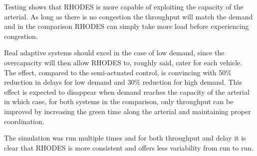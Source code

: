 Testing shows that RHODES is more capable of exploiting the capacity of the arterial. As long as there is no congestion the throughput will match the demand and in the comparison RHODES can simply take more load before experiencing congestion.

Real adaptive systems should excel in the case of low demand, since the overcapacity will then allow RHODES to, roughly said, cater for each vehicle. The effect, compared to the semi-actuated control, is convincing with 50\% reduction in delays for low demand and 30\% reduction for high demand. This effect is expected to disappear when demand reaches the capacity of the arterial in which case, for both systems in the comparison, only throughput can be improved by increasing the green time along the arterial and maintaining proper coordination.

The simulation was run multiple times and for both throughput and delay it is clear that RHODES is more consistent and offers less variability from run to run.